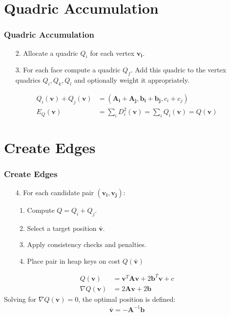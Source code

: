 \documentclass[
	10pt,
	t		%
]{beamer}
\begin{document}
\section{Quadric Accumulation}
\begin{frame}
\frametitle{Quadric Accumulation}
\centering
\begin{enumerate}
\item [2.] Allocate a quadric $Q_i$ for each vertex $\mathbf{v_i}$.
\item [3.] For each face compute a quadric $Q_f$. Add this quadric to the vertex quadrics $Q_i, Q_k, Q_l$ and optionally weight it appropriately.
\end{enumerate}
\begin{align}
Q_i(\mathbf{v}) + Q_j(\mathbf{v}) &= (\mathbf{A_i} + \mathbf{A_j}, \mathbf{b_i} + \mathbf{b_j}, c_i + c_j)\\
E_Q(\mathbf{v}) &= \sum_{i} D_i^2(\mathbf{v}) = \sum_{i} Q_i(\mathbf{v}) = Q(\mathbf{v})
\end{align}
\end{frame}

\section{Create Edges}
\begin{frame}
\frametitle{Create Edges}
\centering
\begin{enumerate}
\item [4.] For each candidate pair $(\mathbf{v_i}, \mathbf{v_j})$:
\begin{enumerate}
\item Compute $Q = Q_i + Q_j$.
\item Select a target position $\mathbf{\bar{v}}$.
\item Apply consistency checks and penalties.
\item Place pair in heap keys on cost $Q(\mathbf{\bar{v}})$
\end{enumerate}
\end{enumerate}

\begin{align}
Q(\mathbf{v}) &= \mathbf{v}^T\mathbf{A}\mathbf{v} + 2\mathbf{b}^T\mathbf{v} + c\\
\nabla Q(\mathbf{v}) &= 2\mathbf{A}\mathbf{v} + 2 \mathbf{b}
\end{align}
Solving for $\nabla Q(\mathbf{v}) = 0$, the optimal position is defined:
\begin{align}
\mathbf{\bar{v}} = -\mathbf{A}^{-1}\mathbf{b}
\label{v_bar}
\end{align}

\end{frame}
\end{document}
